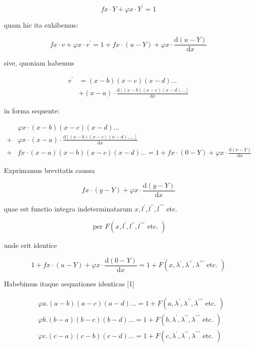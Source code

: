 \documentclass[10pt]{article}
\begin{document}
\[
f x \cdot Y+\varphi x \cdot Y^{\prime}=1
\]

quam hic ita exhibemus:

\[
f x \cdot v+\varphi x \cdot v^{\prime}=1+f x \cdot(u-Y)+\varphi x \cdot \frac{\mathrm{d}(u-Y)}{\mathrm{d} x}
\]

sive, quoniam habemus

\[
\begin{aligned}
v^{\prime} & =(x-b)(x-c)(x-d) \ldots \\
& +(x-a) \cdot \frac{\mathrm{d}[(x-b)(x-c)(x-d) \ldots]}{\mathrm{d} x}
\end{aligned}
\]

in forma sequente:

\[
\begin{aligned}
& \varphi x \cdot(x-b)(x-c)(x-d) \ldots \\
+ & \varphi x \cdot(x-a) \cdot \frac{\mathrm{d}[(x-b)(x-c)(x-d) \ldots . .]}{\mathrm{d} x} \\
+ & f x \cdot(x-a)(x-b)(x-c)(x-d) \ldots=1+f x \cdot(0-Y)+\varphi x \cdot \frac{\mathrm{d}(\nu-Y)}{\mathrm{d} x}
\end{aligned}
\]

Exprimamus brevitatis caussa

\[
f x \cdot(y-Y)+\varphi x \cdot \frac{\mathrm{d}(y-Y)}{\mathrm{d} x}
\]

quae est functio integra indeterminatarum \(x, l^{\prime}, l^{\prime \prime}, l^{\prime \prime \prime}\) etc.

\[
\text { per } F\left(x, l^{\prime}, l^{\prime \prime}, l^{\prime \prime \prime} \text { etc. }\right)
\]

unde erit identice

\[
1+f x \cdot(u-Y)+\varphi x \cdot \frac{\mathrm{d}(0-Y)}{\mathrm{d} x}=1+F\left(x, \lambda^{\prime}, \lambda^{\prime \prime}, \lambda^{\prime \prime \prime} \text { etc. }\right)
\]

Habebimus itaque aequationes identicas [1]

\[
\begin{aligned}
& \varphi a .(a-b)(a-c)(a-d) \ldots=1+F\left(a, \lambda^{\prime}, \lambda^{\prime \prime}, \lambda^{\prime \prime \prime} \text { etc. }\right) \\
& \varphi b .(b-a)(b-c)(b-d) \ldots=1+F\left(b, \lambda^{\prime}, \lambda^{\prime \prime}, \lambda^{\prime \prime \prime} \text { etc. }\right) \\
& \varphi c .(c-a)(c-b)(c-d) \ldots=1+F\left(c, \lambda^{\prime}, \lambda^{\prime \prime}, \lambda^{\prime \prime \prime} \text { etc. }\right)
\end{aligned}
\]
\end{document}
